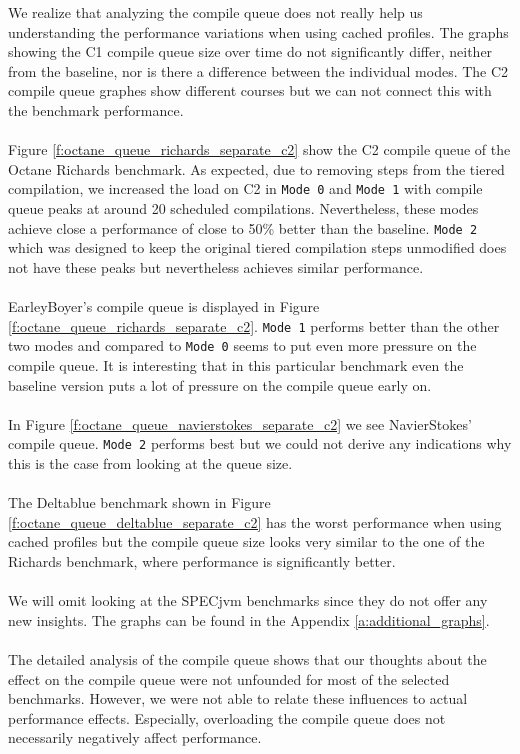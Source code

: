 We realize that analyzing the compile queue does not really help us understanding the performance variations when using cached profiles.
The graphs showing the C1 compile queue size over time do not significantly differ, neither from the baseline, nor is there a difference between the individual modes.
The C2 compile queue graphes show different courses but we can not connect this with the benchmark performance.
\\\\
Figure \ref{f:octane_queue_richards_separate_c2} show the C2 compile queue of the Octane Richards benchmark. As expected, due to removing steps from the tiered compilation, we increased the load on C2 in \texttt{Mode 0} and \texttt{Mode 1} with compile queue peaks at around 20 scheduled compilations. Nevertheless, these modes achieve close a performance of close to 50\% better than the baseline. \texttt{Mode 2} which was designed to keep the original tiered compilation steps unmodified does not have these peaks but nevertheless achieves similar performance.
\\\\
EarleyBoyer's compile queue is displayed in Figure \ref{f:octane_queue_richards_separate_c2}. \texttt{Mode 1} performs better than the other two modes and compared to \texttt{Mode 0} seems to put even more pressure on the compile queue.
It is interesting that in this particular benchmark even the baseline version puts a lot of pressure on the compile queue early on.
\\\\
In Figure \ref{f:octane_queue_navierstokes_separate_c2} we see NavierStokes' compile queue. \texttt{Mode 2} performs best but we could not derive any indications why this is the case from looking at the queue size.
\\\\
The Deltablue benchmark shown in Figure \ref{f:octane_queue_deltablue_separate_c2} has the worst performance when using cached profiles but the compile queue size looks very similar to the one of the Richards benchmark, where performance is significantly better.
\\\\
We will omit looking at the SPECjvm benchmarks since they do not offer any new insights. The graphs can be found in the Appendix \ref{a:additional_graphs}.
\\\\
The detailed analysis of the compile queue shows that our thoughts about the effect on the compile queue were not unfounded for most of the selected benchmarks. However, we were not able to relate these influences to actual performance effects. Especially, overloading the compile queue does not necessarily negatively affect performance.
